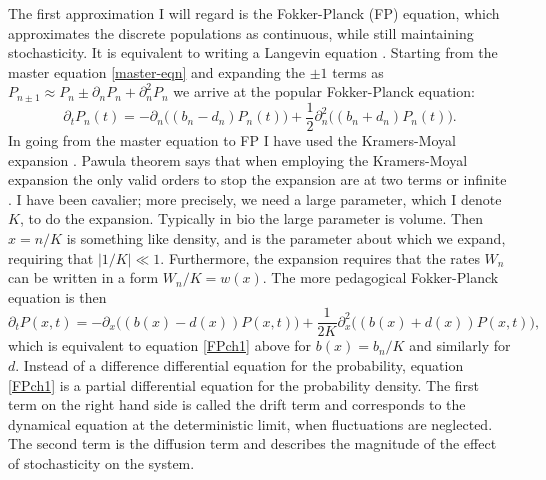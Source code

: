The first approximation I will regard is the Fokker-Planck (FP) equation, which approximates the discrete populations as continuous, while still maintaining stochasticity. It is equivalent to writing a Langevin equation \cite{Gardiner2004?}. %
Starting from the master equation \ref{master-eqn} and expanding the $\pm 1$ terms as $P_{n\pm 1} \approx P_n \pm \partial_n P_n + \partial^2_n P_n$ we arrive at the popular Fokker-Planck equation:
\begin{equation}
\partial_t P_n(t) = - \partial_n\big( (b_n - d_n) P_n(t) \big) + \frac{1}{2} \partial_n^2 \Big( (b_n + d_n) P_n(t) \Big). \label{FPch1}
\end{equation}
In going from the master equation to FP I have used the Kramers-Moyal expansion \cite{Gardiner2004}. Pawula theorem says that when employing the Kramers-Moyal expansion the only valid orders to stop the expansion are at two terms or infinite \cite{??Risken??}. 
I have been cavalier; more precisely, we need a large parameter, which I denote $K$, to do the expansion. Typically in bio the large parameter is volume. Then $x=n/K$ is something like density, and is the parameter about which we expand, requiring that $|1/K| \ll 1$. 
Furthermore, the expansion requires that the rates $W_n$ can be written in a form $W_n/K = w(x)$. %
The more pedagogical Fokker-Planck equation is then
\begin{equation}
\partial_t P(x,t) = - \partial_x\big( (b(x) - d(x)) P(x,t) \big) + \frac{1}{2 K} \partial_x^2 \Big( (b(x) + d(x)) P(x,t) \Big),
\end{equation}
which is equivalent to equation \ref{FPch1} above for $b(x) = b_n/K$ and similarly for $d$. 
Instead of a difference differential equation for the probability, equation \ref{FPch1} is a partial differential equation for the probability density. %
The first term on the right hand side is called the drift term and corresponds to the dynamical equation at the deterministic limit, when fluctuations are neglected. 
The second term is the diffusion term and describes the magnitude of the effect of stochasticity on the system. 
